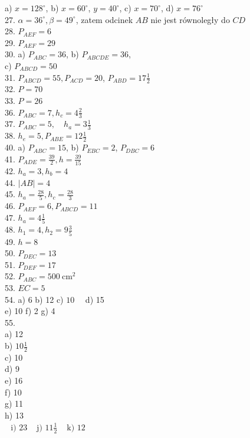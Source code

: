 \documentclass[10pt]{article}
\begin{document}
a) \(x=128^{\circ}\), b) \(x=60^{\circ}\), \(y=40^{\circ}\), c) \(x=70^{\circ}\), d) \(x=76^{\circ}\)\\
27. \(\alpha=36^{\circ}, \beta=49^{\circ}\), zatem odcinek \(A B\) nie jest równoległy do \(C D\)\\
28. \(P_{A E F}=6\)\\
29. \(P_{A E F}=29\)\\
30. a) \(P_{A B C}=36\), b) \(P_{A B C D E}=36\),\\
c) \(P_{A B C D}=50\)\\
31. \(P_{A B C D}=55, P_{A C D}=20\), \(P_{A B D}=17 \frac{1}{2}\)\\
32. \(P=70\)\\
33. \(P=26\)\\
36. \(P_{A B C}=7, h_{c}=4 \frac{2}{3}\)\\
37. \(P_{A B C}=5, \quad h_{a}=3 \frac{1}{3}\)\\
38. \(h_{e}=5, P_{A B E}=12 \frac{1}{2}\)\\
40. a) \(P_{A B C}=15\), b) \(P_{E B C}=2\), \(P_{D B C}=6\)\\
41. \(P_{A D E}=\frac{39}{2}, h=\frac{39}{15}\)\\
42. \(h_{a}=3, h_{b}=4\)\\
44. \(|A B|=4\)\\
45. \(h_{a}=\frac{28}{5}, h_{c}=\frac{28}{3}\)\\
46. \(P_{A E F}=6, P_{A B C D}=11\)\\
47. \(h_{a}=4 \frac{1}{5}\)\\
48. \(h_{1}=4, h_{2}=9 \frac{3}{5}\)\\
49. \(h=8\)\\
50. \(P_{D E C}=13\)\\
51. \(P_{D E F}=17\)\\
52. \(P_{A B C}=500 \mathrm{~cm}^{2}\)\\
53. \(E C=5\)\\
54. a) 6 b) 12 c) \(10 \quad\) d) 15\\
e) 10 f) 2 g) 4\\
55.\\
a) 12\\
b) \(10 \frac{1}{2}\)\\
c) 10\\
d) 9\\
e) 16\\
f) 10\\
g) 11\\
h) 13\\
\(\begin{array}{lll}\text { i) } 23 & \text { j) } 11 \frac{1}{2} & \text { k) } 12\end{array}\)\\
\end{document}
